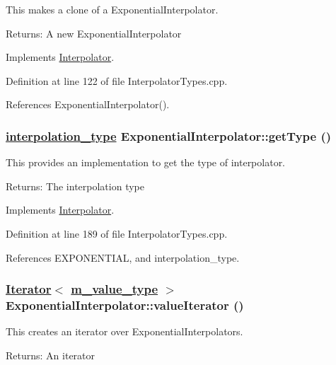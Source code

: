 This makes a clone of a Exponential\-Interpolator. \begin{Desc}
\item[Returns:]A new Exponential\-Interpolator \end{Desc}


Implements \hyperlink{classInterpolator_a1}{Interpolator}.

Definition at line 122 of file Interpolator\-Types.cpp.

References Exponential\-Interpolator().\hypertarget{classExponentialInterpolator_a3}{
\subsubsection[getType]{\setlength{\rightskip}{0pt plus 5cm}\hyperlink{Types_8h_a13}{interpolation\_\-type} Exponential\-Interpolator::get\-Type ()}}
\label{classExponentialInterpolator_a3}


This provides an implementation to get the type of interpolator. \begin{Desc}
\item[Returns:]The interpolation type \end{Desc}


Implements \hyperlink{classInterpolator_a6}{Interpolator}.

Definition at line 189 of file Interpolator\-Types.cpp.

References EXPONENTIAL, and interpolation\_\-type.\hypertarget{classExponentialInterpolator_a2}{
\subsubsection[valueIterator]{\setlength{\rightskip}{0pt plus 5cm}\hyperlink{classIterator}{Iterator}$<$ \hyperlink{Types_8h_a3}{m\_\-value\_\-type} $>$ Exponential\-Interpolator::value\-Iterator ()}}
\label{classExponentialInterpolator_a2}


This creates an iterator over Exponential\-Interpolators. \begin{Desc}
\item[Returns:]An iterator \end{Desc}


